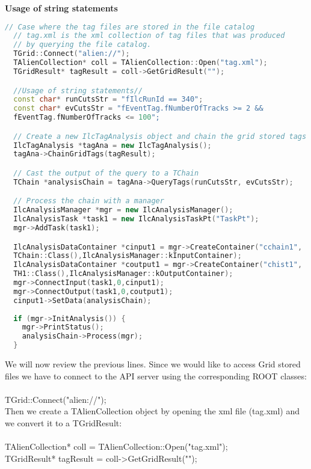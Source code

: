 \vspace{0.5 cm}
\textbf{Usage of string statements}
\begin{lstlisting}[language=C++]
  // Case where the tag files are stored in the file catalog
  // tag.xml is the xml collection of tag files that was produced 
  // by querying the file catalog.
  TGrid::Connect("alien://"); 
  TAlienCollection* coll = TAlienCollection::Open("tag.xml");
  TGridResult* tagResult = coll->GetGridResult("");

  //Usage of string statements//
  const char* runCutsStr = "fIlcRunId == 340";
  const char* evCutsStr = "fEventTag.fNumberOfTracks >= 2 &&
  fEventTag.fNumberOfTracks <= 100";

  // Create a new IlcTagAnalysis object and chain the grid stored tags
  IlcTagAnalysis *tagAna = new IlcTagAnalysis(); 
  tagAna->ChainGridTags(tagResult);

  // Cast the output of the query to a TChain
  TChain *analysisChain = tagAna->QueryTags(runCutsStr, evCutsStr);

  // Process the chain with a manager
  IlcAnalysisManager *mgr = new IlcAnalysisManager();
  IlcAnalysisTask *task1 = new IlcAnalysisTaskPt("TaskPt");
  mgr->AddTask(task1);

  IlcAnalysisDataContainer *cinput1 = mgr->CreateContainer("cchain1",
  TChain::Class(),IlcAnalysisManager::kInputContainer);
  IlcAnalysisDataContainer *coutput1 = mgr->CreateContainer("chist1", 
  TH1::Class(),IlcAnalysisManager::kOutputContainer);
  mgr->ConnectInput(task1,0,cinput1);
  mgr->ConnectOutput(task1,0,coutput1);
  cinput1->SetData(analysisChain);
  
  if (mgr->InitAnalysis()) {
    mgr->PrintStatus();
    analysisChain->Process(mgr);
  }
\end{lstlisting}


\noindent We will now review the previous lines. Since we would like to access Grid stored files we have to connect to the API server using the corresponding ROOT classes:\\
\\
{\ttfamily TGrid::Connect("alien://");}\\

Then we create a {\ttfamily TAlienCollection} object by opening the xml file (tag.xml) and we convert it to a {\ttfamily TGridResult}:\\
\\
{\ttfamily TAlienCollection* coll = TAlienCollection::Open("tag.xml");}\\
{\ttfamily TGridResult* tagResult = coll->GetGridResult("");}\\

